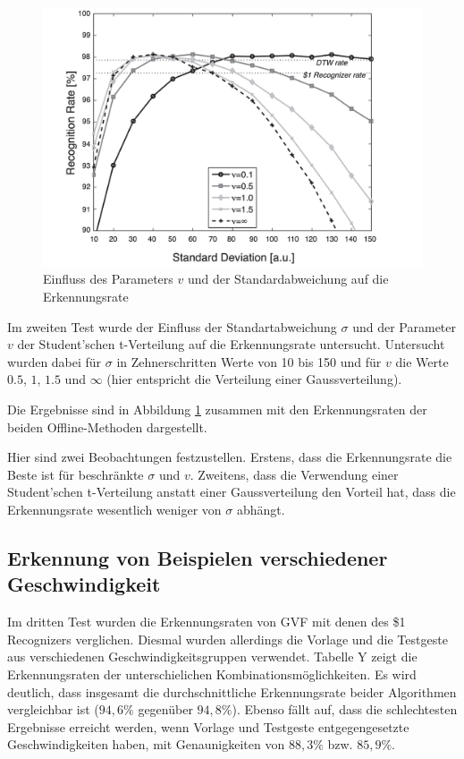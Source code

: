 \documentclass{llncs}
\begin{document}
\begin{figure}
\centering
\includegraphics[width=0.7\linewidth]{../Bilder/Fig4}
\caption{Einfluss des Parameters $v$ und der Standardabweichung auf die Erkennungsrate}
\label{fig:Fig}
\end{figure}

Im zweiten Test wurde der Einfluss der Standartabweichung $\sigma$ und der Parameter $v$ der Student'schen t-Verteilung auf die Erkennungsrate untersucht. Untersucht wurden dabei für $\sigma$ in Zehnerschritten Werte von 10 bis 150 und für $v$ die Werte $0.5$, $1$, $1.5$ und $\infty$ (hier entspricht die Verteilung einer Gaussverteilung).

Die Ergebnisse sind in Abbildung \ref{fig:Fig} zusammen mit den Erkennungsraten der beiden Offline-Methoden dargestellt.


Hier sind zwei Beobachtungen festzustellen. Erstens, dass die Erkennungsrate die Beste ist für beschränkte $\sigma$ und $v$. Zweitens, dass die Verwendung einer Student'schen t-Verteilung anstatt einer Gaussverteilung den Vorteil hat, dass die Erkennungsrate wesentlich weniger von $\sigma$ abhängt.

\subsection{Erkennung von Beispielen verschiedener Geschwindigkeit}
Im dritten Test wurden die Erkennungsraten von GVF mit denen des \$1 Recognizers verglichen. Diesmal wurden allerdings die Vorlage und die Testgeste aus verschiedenen Geschwindigkeitsgruppen verwendet. Tabelle Y zeigt die Erkennungsraten der unterschielichen Kombinationsmöglichkeiten. Es wird deutlich, dass insgesamt die durchschnittliche Erkennungsrate beider Algorithmen vergleichbar ist ($94,6\%$ gegenüber $94,8\%$). Ebenso fällt auf, dass die schlechtesten Ergebnisse erreicht werden, wenn Vorlage und Testgeste  entgegengesetzte Geschwindigkeiten haben, mit Genaunigkeiten von $88,3\%$ bzw. $85,9\%$.
\end{document}
